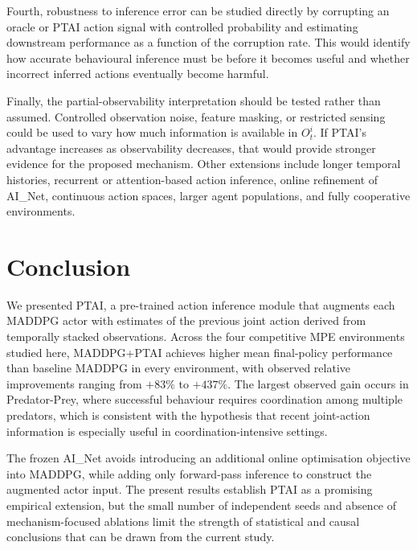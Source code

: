 \documentclass[12pt]{article}
\begin{document}
Fourth, robustness to inference error can be studied directly by corrupting an oracle or
PTAI action signal with controlled probability and estimating downstream performance as a
function of the corruption rate. This would identify how accurate behavioural inference
must be before it becomes useful and whether incorrect inferred actions eventually become
harmful.

Finally, the partial-observability interpretation should be tested rather than assumed.
Controlled observation noise, feature masking, or restricted sensing could be used to
vary how much information is available in $O_t^i$. If PTAI's advantage increases as
observability decreases, that would provide stronger evidence for the proposed mechanism.
Other extensions include longer temporal histories, recurrent or attention-based action
inference, online refinement of AI\_Net, continuous action spaces, larger agent
populations, and fully cooperative environments.

\section{Conclusion}

We presented PTAI, a pre-trained action inference module that augments each MADDPG actor
with estimates of the previous joint action derived from temporally stacked observations.
Across the four competitive MPE environments studied here, MADDPG+PTAI achieves higher
mean final-policy performance than baseline MADDPG in every environment, with observed
relative improvements ranging from $+83\%$ to $+437\%$. The largest observed gain occurs
in Predator-Prey, where successful behaviour requires coordination among multiple
predators, which is consistent with the hypothesis that recent joint-action information
is especially useful in coordination-intensive settings.

The frozen AI\_Net avoids introducing an additional online optimisation objective into
MADDPG, while adding only forward-pass inference to construct the augmented actor input.
The present results establish PTAI as a promising empirical extension, but the small
number of independent seeds and absence of mechanism-focused ablations limit the strength
of statistical and causal conclusions that can be drawn from the current study.
\end{document}
